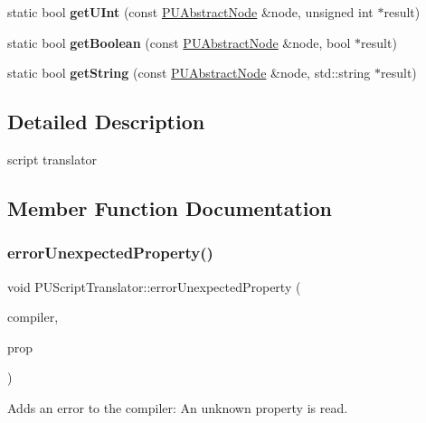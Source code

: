 \begin{DoxyCompactItemize}
static bool {\bfseries get\+U\+Int} (const \hyperlink{classPUAbstractNode}{P\+U\+Abstract\+Node} \&node, unsigned int $\ast$result)
\item 
\mbox{\label{classPUScriptTranslator_a2dc2831b4018381ebcda7883eff1241c}} 
static bool {\bfseries get\+Boolean} (const \hyperlink{classPUAbstractNode}{P\+U\+Abstract\+Node} \&node, bool $\ast$result)
\item 
\mbox{\label{classPUScriptTranslator_a209eda6a25ead43d34f3a080287810ed}} 
static bool {\bfseries get\+String} (const \hyperlink{classPUAbstractNode}{P\+U\+Abstract\+Node} \&node, std\+::string $\ast$result)
\end{DoxyCompactItemize}


\subsection{Detailed Description}
script translator 

\subsection{Member Function Documentation}
\mbox{\label{classPUScriptTranslator_a9752b9ee3231292a617cffe543515da9}} 
\subsubsection{\texorpdfstring{error\+Unexpected\+Property()}{errorUnexpectedProperty()}\hspace{0.1cm}{\footnotesize\ttfamily [1/2]}}
{\footnotesize\ttfamily void P\+U\+Script\+Translator\+::error\+Unexpected\+Property (\begin{DoxyParamCaption}\item[{\hyperlink{classPUScriptCompiler}{P\+U\+Script\+Compiler} $\ast$}]{compiler,  }\item[{\hyperlink{classPUPropertyAbstractNode}{P\+U\+Property\+Abstract\+Node} $\ast$}]{prop }\end{DoxyParamCaption})}

Adds an error to the compiler\+: An unknown property is read. \mbox{\label{classPUScriptTranslator_a9752b9ee3231292a617cffe543515da9}} 

